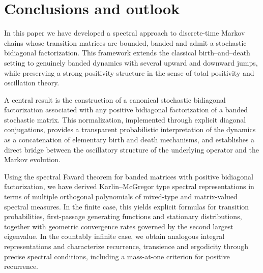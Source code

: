 \documentclass[11pt]{amsart}
\theoremstyle{plain}
\newcommand{\diag}{\operatorname{diag}}
\newcommand{\1}{\text{\fontseries{bx}\selectfont \textup 1}}
\begin{document}
%

\section*{Conclusions and outlook}

In this paper we have developed a spectral approach to discrete-time Markov chains whose transition matrices are bounded, banded and admit a stochastic bidiagonal factorization. This framework extends the classical birth--and--death setting to genuinely banded dynamics with several upward and downward jumps, while preserving a strong positivity structure in the sense of total positivity and oscillation theory.

A central result is the construction of a canonical stochastic bidiagonal factorization associated with any positive bidiagonal factorization of a banded stochastic matrix. This normalization, implemented through explicit diagonal conjugations, provides a transparent probabilistic interpretation of the dynamics as a concatenation of elementary birth and death mechanisms, and establishes a direct bridge between the oscillatory structure of the underlying operator and the Markov evolution.

Using the spectral Favard theorem for banded matrices with positive bidiagonal factorization, we have derived Karlin--McGregor type spectral representations in terms of  multiple orthogonal polynomials of mixed-type and matrix-valued spectral measures. In the finite case, this yields explicit formulas for transition probabilities, first-passage generating functions and stationary distributions, together with geometric convergence rates governed by the second largest eigenvalue. In the countably infinite case, we obtain analogous integral representations and characterize recurrence, transience and ergodicity through precise spectral conditions, including a mass-at-one criterion for positive recurrence.
\end{document}
